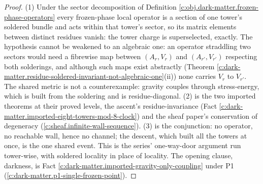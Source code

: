 \documentclass[11pt]{article}
\theoremstyle{definition}
\theoremstyle{plain}
\begin{document}
\begin{proof}
(1) Under the sector decomposition of Definition \ref{c:obj.dark-matter.frozen-phase-operators} every frozen-phase local operator is a section of one tower's soldered bundle and acts within that tower's sector, so its matrix elements between distinct residues vanish: the tower charge is superselected, exactly. The hypothesis cannot be weakened to an algebraic one: an operator straddling two sectors would need a fibrewise map between $(A_{r}, V_{r})$ and $(A_{r'}, V_{r'})$ respecting both solderings, and although such maps exist abstractly (Theorem \ref{c:dark-matter.residue-soldered-invariant-not-algebraic-one}(ii)) none carries $V_{r}$ to $V_{r'}$. The shared metric is not a counterexample: gravity couples through stress-energy, which is built from the soldering and is residue-diagonal. (2) is the two imported theorems at their proved levels, the ascent's residue-invariance (Fact \ref{c:dark-matter.imported-eight-towers-mod-8-clock}) and the sheaf paper's conservation of degeneracy (\ref{c:sheaf.infinite-wall-sequence}). (3) is the conjunction: no operator, no reachable wall, hence no channel; the descent, which built all the towers at once, is the one shared event. This is the series' one-way-door argument run tower-wise, with soldered locality in place of locality. The opening clause, darkness, is Fact \ref{c:dark-matter.imported-gravity-only-coupling} under P1 (\ref{c:dark-matter.p1-single-frozen-point}).

\end{proof}
\end{document}
